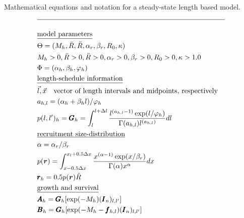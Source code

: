 \documentclass[12pt,letterpaper]{article}
\newcounter{saveEq}
\def\putEq{\setcounter{saveEq}{\value{equation}}}
\def\tableEq{ %
    \putEq \setcounter{equation}{0}
    \renewcommand{\theequation}{T\arabic{table}.\arabic{equation}}
    \vspace{-5mm}
    }
\begin{document}
\begin{table}
  \centering
\caption{Mathematical equations and notation for a steady-state length based model.}
\label{tab:equilibrium_model}
\tableEq
  \begin{align}
    \hline \nonumber \\
    &\mbox{\underline{model parameters}} \nonumber\\
    &\Theta = (M_h,\bar{R},\ddot{R},\alpha_r,\beta_r,R_0,\kappa) \label{T1.1}\\
    &M_h > 0 , \bar{R} > 0, \ddot{R}>0, \alpha_r > 0, \beta_r > 0, R_0>0,\kappa > 1.0 \label{T1.2}\\
    &\Phi = (\alpha_h,\beta_h,\varphi_h) \label{T1.3}\\
    &\mbox{\underline{length-schedule information}} \nonumber \\
    &\vec{l},\vec{x} \quad \mbox{vector of length intervals and midpoints, respectively} \nonumber\\
    &a_{h,l} = (\alpha_h + \beta_h l)/\varphi_h \label{T1.4} \\ 
    &p({l},{l'})_h =\pmb{G}_h= \int_{l}^{l+\Delta l}
        \frac{ l^{(a_{h,l}-1)} \exp(l/\varphi_h) }
        { \Gamma(a_{h,l}) l^{(a_{h,l})} } dl \label{T1.5} \\
    &\mbox{\underline{recruitment size-distribution}} \nonumber \\
    & \alpha = \alpha_r / \beta_r  \\
    &p(\boldsymbol{r}) = \int_{x-0.5\Delta x}^{x_l+0.5\Delta x} 
      \frac{x^{(\alpha-1)}\exp(x / \beta_r)}{\Gamma(\alpha)x^\alpha}dx 
        \label{T1.7}\\
    &\pmb{r}_h = 0.5 p(\boldsymbol{r}) \ddot{R} \label{T1.8}\\
    &\mbox{\underline{growth and survival}} \nonumber \\
    &\pmb{A}_h = \pmb{G}_h [\exp(-M_h) (\pmb{I}_n)_{l,l'}]\label{T1.10}\\
    &\pmb{B}_h = \pmb{G}_h [\exp(-M_h - \pmb{f}_{h,l}) (\pmb{I}_n)_{l,l'}] \label{T1.12}\\

\end{align}
\end{table}
\end{document}
